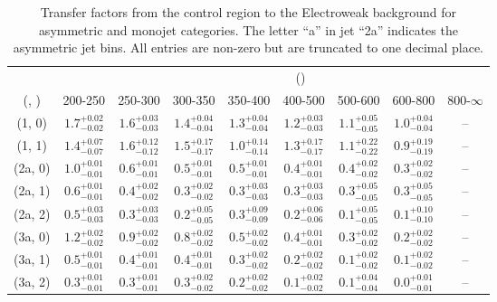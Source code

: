 \begin{table}[h!]
\tiny
\centering
\caption{Transfer factors from the \mj control region to the Electroweak background for asymmetric and monojet categories. The letter ``a'' in jet \eg ``2a''  indicates the asymmetric jet bins. All entries are non-zero but are truncated to one decimal place.\label{tab:tf_mu_total_asym}}
\begin{tabular}
{ccccccccc}
	\hline\hline
&	& \multicolumn{8}{c}{\scalht (\gev)} \\ 
	 (\njet,  \nb) & 200-250 & 250-300 & 300-350 & 350-400 & 400-500 & 500-600 & 600-800 & 800-$\infty$ \\ [0.8ex] 
\hline
	(1, 0) & $1.7^{+ 0.02 }_{- 0.02 }$ & $1.6^{+ 0.03 }_{- 0.03 }$ & $1.4^{+ 0.04 }_{- 0.04 }$ & $1.3^{+ 0.04 }_{- 0.04 }$ & $1.2^{+ 0.03 }_{- 0.03 }$ & $1.1^{+ 0.05 }_{- 0.05 }$ & $1.0^{+ 0.04 }_{- 0.04 }$ & -- \\[0.5ex] 
	(1, 1) & $1.4^{+ 0.07 }_{- 0.07 }$ & $1.6^{+ 0.12 }_{- 0.12 }$ & $1.5^{+ 0.17 }_{- 0.17 }$ & $1.0^{+ 0.14 }_{- 0.14 }$ & $1.3^{+ 0.17 }_{- 0.17 }$ & $1.1^{+ 0.22 }_{- 0.22 }$ & $0.9^{+ 0.19 }_{- 0.19 }$ & -- \\[0.5ex] 
	(2a, 0) & $1.0^{+ 0.01 }_{- 0.01 }$ & $0.6^{+ 0.01 }_{- 0.01 }$ & $0.5^{+ 0.01 }_{- 0.01 }$ & $0.5^{+ 0.01 }_{- 0.01 }$ & $0.4^{+ 0.01 }_{- 0.01 }$ & $0.4^{+ 0.02 }_{- 0.02 }$ & $0.3^{+ 0.02 }_{- 0.02 }$ & -- \\[0.5ex] 
	(2a, 1) & $0.6^{+ 0.01 }_{- 0.01 }$ & $0.4^{+ 0.02 }_{- 0.02 }$ & $0.3^{+ 0.02 }_{- 0.02 }$ & $0.3^{+ 0.03 }_{- 0.03 }$ & $0.3^{+ 0.03 }_{- 0.03 }$ & $0.3^{+ 0.05 }_{- 0.05 }$ & $0.3^{+ 0.05 }_{- 0.05 }$ & -- \\[0.5ex] 
	(2a, 2) & $0.5^{+ 0.03 }_{- 0.03 }$ & $0.3^{+ 0.03 }_{- 0.03 }$ & $0.2^{+ 0.05 }_{- 0.05 }$ & $0.3^{+ 0.09 }_{- 0.09 }$ & $0.2^{+ 0.06 }_{- 0.06 }$ & $0.1^{+ 0.05 }_{- 0.05 }$ & $0.1^{+ 0.10 }_{- 0.10 }$ & -- \\[0.5ex] 
	(3a, 0) & $1.2^{+ 0.02 }_{- 0.02 }$ & $0.9^{+ 0.02 }_{- 0.02 }$ & $0.8^{+ 0.02 }_{- 0.02 }$ & $0.5^{+ 0.02 }_{- 0.02 }$ & $0.4^{+ 0.01 }_{- 0.01 }$ & $0.3^{+ 0.02 }_{- 0.02 }$ & $0.2^{+ 0.02 }_{- 0.02 }$ & -- \\[0.5ex] 
	(3a, 1) & $0.5^{+ 0.01 }_{- 0.01 }$ & $0.4^{+ 0.01 }_{- 0.01 }$ & $0.4^{+ 0.01 }_{- 0.01 }$ & $0.3^{+ 0.02 }_{- 0.02 }$ & $0.2^{+ 0.02 }_{- 0.02 }$ & $0.1^{+ 0.02 }_{- 0.02 }$ & $0.1^{+ 0.02 }_{- 0.02 }$ & -- \\[0.5ex] 
	(3a, 2) & $0.3^{+ 0.01 }_{- 0.01 }$ & $0.3^{+ 0.01 }_{- 0.01 }$ & $0.3^{+ 0.02 }_{- 0.02 }$ & $0.2^{+ 0.02 }_{- 0.02 }$ & $0.1^{+ 0.02 }_{- 0.02 }$ & $0.1^{+ 0.04 }_{- 0.04 }$ & $0.0^{+ 0.01 }_{- 0.01 }$ & -- \\[0.5ex] 

\end{tabular}
\end{table}
